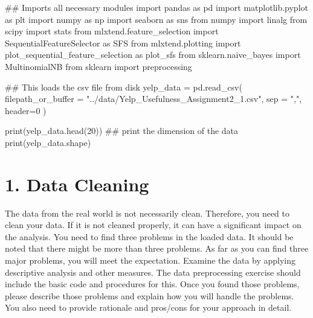 \documentclass[
  letterpaper,
]{scrbook}
\newenvironment{Shaded}{\begin{snugshade}}{\end{snugshade}}
\newcommand{\BuiltInTok}[1]{\textcolor[rgb]{0.00,0.23,0.31}{#1}}
\newcommand{\CommentTok}[1]{\textcolor[rgb]{0.37,0.37,0.37}{#1}}
\newcommand{\DecValTok}[1]{\textcolor[rgb]{0.68,0.00,0.00}{#1}}
\newcommand{\ImportTok}[1]{\textcolor[rgb]{0.00,0.46,0.62}{#1}}
\newcommand{\NormalTok}[1]{\textcolor[rgb]{0.00,0.23,0.31}{#1}}
\newcommand{\OperatorTok}[1]{\textcolor[rgb]{0.37,0.37,0.37}{#1}}
\newcommand{\StringTok}[1]{\textcolor[rgb]{0.13,0.47,0.30}{#1}}
\begin{document}
\begin{Shaded}
\begin{Highlighting}[]
\CommentTok{\#\# Imports all necessary modules}
\ImportTok{import}\NormalTok{ pandas }\ImportTok{as}\NormalTok{ pd}
\ImportTok{import}\NormalTok{ matplotlib.pyplot }\ImportTok{as}\NormalTok{ plt}
\ImportTok{import}\NormalTok{ numpy }\ImportTok{as}\NormalTok{ np}
\ImportTok{import}\NormalTok{ seaborn }\ImportTok{as}\NormalTok{ sns}
\ImportTok{from}\NormalTok{ numpy }\ImportTok{import}\NormalTok{ linalg}
\ImportTok{from}\NormalTok{ scipy }\ImportTok{import}\NormalTok{ stats}
\ImportTok{from}\NormalTok{ mlxtend.feature\_selection }\ImportTok{import}\NormalTok{ SequentialFeatureSelector }\ImportTok{as}\NormalTok{ SFS}
\ImportTok{from}\NormalTok{ mlxtend.plotting }\ImportTok{import}\NormalTok{ plot\_sequential\_feature\_selection }\ImportTok{as}\NormalTok{ plot\_sfs}
\ImportTok{from}\NormalTok{ sklearn.naive\_bayes }\ImportTok{import}\NormalTok{ MultinomialNB}
\ImportTok{from}\NormalTok{ sklearn }\ImportTok{import}\NormalTok{ preprocessing}

\CommentTok{\#\# This loads the csv file from disk}
\NormalTok{yelp\_data }\OperatorTok{=}\NormalTok{ pd.read\_csv(}
\NormalTok{    filepath\_or\_buffer }\OperatorTok{=} \StringTok{"../data/Yelp\_Usefulness\_Assignment2\_1.csv"}\NormalTok{, sep }\OperatorTok{=} \StringTok{","}\NormalTok{, header}\OperatorTok{=}\DecValTok{0}\NormalTok{ )}

\BuiltInTok{print}\NormalTok{(yelp\_data.head(}\DecValTok{20}\NormalTok{))}
\CommentTok{\#\# print the dimension of the data}
\BuiltInTok{print}\NormalTok{(yelp\_data.shape)}
\end{Highlighting}
\end{Shaded}

\section*{1. Data Cleaning}\label{data-cleaning-1}


The data from the real world is not necessarily clean. Therefore, you
need to clean your data. If it is not cleaned properly, it can have a
significant impact on the analysis. You need to find three problems in
the loaded data. It should be noted that there might be more than three
problems. As far as you can find three major problems, you will meet the
expectation. Examine the data by applying descriptive analysis and other
measures. The data preprocessing exercise should include the basic code
and procedures for this. Once you found those problems, please describe
those problems and explain how you will handle the problems. You also
need to provide rationale and pros/cons for your approach in detail.
\end{document}
